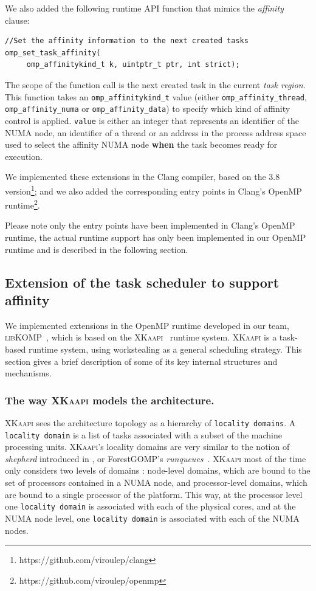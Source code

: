 \documentclass{Styles/llncs}
\newcommand{\kaapi}{\textsc{\mbox{XKaapi}}\xspace}
\newcommand{\libXKOMP}{\textsc{libKOMP}\xspace}
\begin{document}
We also added the following runtime API function that mimics the \textit{affinity} clause:
\begin{lstlisting}
//Set the affinity information to the next created tasks
omp_set_task_affinity( 
     omp_affinitykind_t k, uintptr_t ptr, int strict);
\end{lstlisting}
The scope of the function call is the next created task in the current \textit{task region}.
This function takes an \texttt{omp\_affinitykind\_t} value (either \texttt{omp\_affinity\_thread}, \texttt{omp\_affinity\_numa} or \texttt{omp\_affinity\_data}) to specify which kind of affinity control is applied. \texttt{value} is either an integer that represents an identifier of the NUMA node, an identifier of a thread or an address in the process address space used to select the affinity NUMA node \textbf{when} the task becomes ready for execution.

We implemented these extensions in the Clang compiler, based on the 3.8 version\footnote{https://github.com/viroulep/clang}; and we also added the corresponding entry points in Clang's OpenMP runtime\footnote{https://github.com/viroulep/openmp}.

Please note only the entry points have been implemented in Clang's OpenMP runtime, the actual runtime support has only been implemented in our OpenMP runtime and is described in the following section.


\subsection{Extension of the task scheduler to support affinity}

We implemented extensions in the OpenMP runtime developed in our team, \libXKOMP~\cite{Durand2013,libkomp},
which is based on the \kaapi~\cite{Bleuse2014,parco2015} runtime system.
\kaapi is a task-based runtime system, using workstealing as a general scheduling strategy.
This section gives a brief description of some of its key internal structures and mechanisms.

\subsubsection{The way \kaapi models the architecture.}
\kaapi sees the architecture topology as a hierarchy of \verb/locality domains/.
A \verb/locality domain/ is a list of tasks associated with a subset of the machine processing units.
\kaapi's locality domains are very similar to the notion of \emph{shepherd} introduced in \cite{DBLP:journals/ijhpca/OlivierPWSP12}, or ForestGOMP's \emph{runqueues}~\cite{BroFurGogWacNam10IJPP}.
\kaapi most of the time only considers two levels of domains : node-level domains,
which are bound to the set of processors contained in a NUMA node, and processor-level domains, which are bound to a single processor of the platform.
This way, at the processor level one \verb/locality domain/ is associated with each of the physical cores, and
at the NUMA node level, one \verb/locality domain/ is associated with each of the NUMA nodes.
\end{document}
